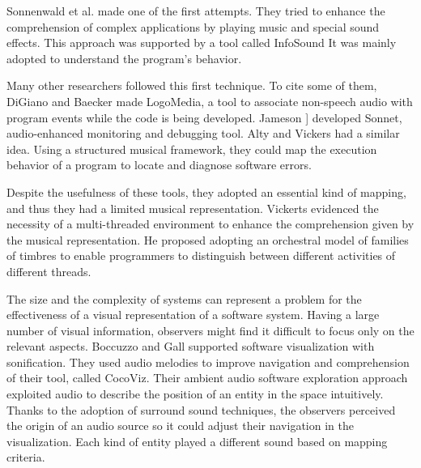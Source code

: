 \bigbreak
Sonnenwald et al. made one of the first attempts. \cite{Sonnenwald1990}
They tried to enhance the comprehension of complex applications by playing music and special sound effects. 
This approach was supported by a tool called InfoSound
It was mainly adopted to understand the program's behavior. 

\bigbreak
Many other researchers followed this first technique. To cite some of them, DiGiano and Baecker \cite{DiGiano1993} made LogoMedia, a tool to associate non-speech
 audio with program events while the code is being developed. 
Jameson \cite{Jameson1994}] developed Sonnet, audio-enhanced monitoring and debugging tool.  
Alty and Vickers \cite{Vickers2003} had a similar idea. Using a structured musical framework, they could map the execution behavior of a program to locate and diagnose software errors. 
 
\bigbreak
Despite the usefulness of these tools, they adopted an essential kind of mapping, and thus they had a limited musical representation. 
Vickerts \cite{Vickers2004} evidenced the necessity of a multi-threaded environment to enhance the comprehension given by the musical representation. 
He proposed adopting an orchestral model of families of timbres to enable programmers to distinguish between different activities of different threads.

\bigbreak
The size and the complexity of systems can represent a problem for the effectiveness of a visual representation of a software system.
Having a large number of visual information, observers might find it difficult to focus only on the relevant aspects. 
Boccuzzo and Gall \cite{Boccuzzo2009} supported software visualization with sonification. 
They used audio melodies to improve navigation and comprehension of their tool, called CocoViz.
Their ambient audio software exploration approach exploited audio to describe the position of an entity in the space intuitively. 
Thanks to the adoption of surround sound techniques, the observers perceived the origin of an audio source so it could adjust their navigation in the visualization.
Each kind of entity played a different sound based on mapping criteria.

